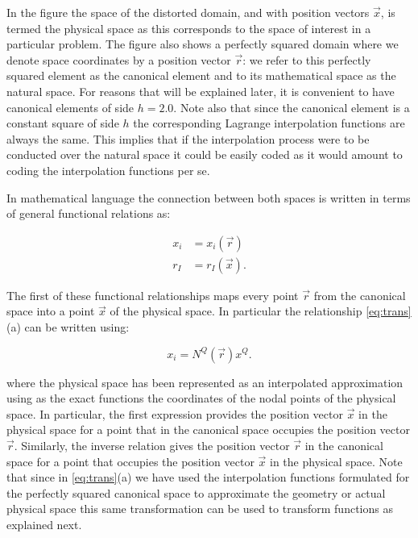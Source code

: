 In the figure the space of the distorted domain, and with position vectors $\overrightarrow x$, is termed the physical space as this corresponds to the space of interest in a particular problem. The figure also shows a perfectly squared domain where we denote space coordinates by a position vector $\overrightarrow r$: we refer to this perfectly squared element as the canonical element and to its mathematical space as the natural space. For reasons that will be explained later, it is convenient to  have canonical elements of side $h = 2.0$. Note also that since the canonical element is a constant square of side $h$ the corresponding Lagrange interpolation functions are always the same. This implies that if the interpolation process were to be conducted over the natural space it could be easily coded as it would amount to coding the interpolation functions per se.

In mathematical language the connection between both spaces is written in terms of general functional relations as:

\begin{equation}
\begin{aligned}
x_i &=x_i(\overrightarrow r)\\
r_I &=r_I(\overrightarrow x).
\end{aligned}
\label{eq:trans}
\end{equation}

The first of these functional relationships maps every point $\overrightarrow r$ from the canonical space into a point $\overrightarrow x$ of the physical space. In particular the relationship \ref{eq:trans}(a) can be written using:


\begin{equation}
x_i=N^Q(\overrightarrow r)x^Q.
\label{eq:trans_iso}
\end{equation}


where the physical space has been represented as an interpolated approximation using as the exact functions the coordinates of the nodal points of the physical space. In particular, the first expression provides the position vector $\overrightarrow x$ in the physical space for a point that in the canonical space occupies the position vector $\overrightarrow r$. Similarly, the inverse relation gives the position vector $\overrightarrow r$ in the canonical space for a point that occupies the position vector $\overrightarrow x$ in the physical space. Note that since in \ref{eq:trans}(a) we have used the interpolation functions formulated for the perfectly squared canonical space to approximate the geometry or actual physical space this same transformation can be used to transform functions as explained next.

